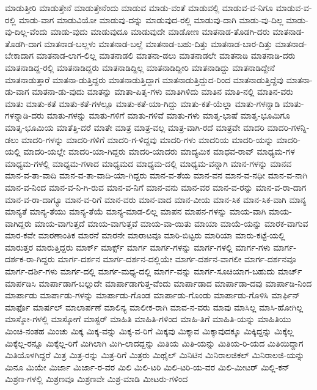 {ಮಾಡುತ್ತೀರಿ
ಮಾಡುತ್ತೇನೆ
ಮಾಡುತ್ತೇನೆಂದು
ಮಾಡುವ
ಮಾಡು-ವಂತೆ
ಮಾಡುವಲ್ಲಿ
ಮಾಡುವ-ವ-ನಿಗೂ
ಮಾಡುವ-ವ-ರಲ್ಲಿ
ಮಾಡು-ವಾಗ
ಮಾಡುವಿಯೋ
ಮಾಡುವು-ದನ್ನು
ಮಾಡುವುದ-ರಲ್ಲಿ
ಮಾಡುವು-ದಾಗಿ
ಮಾಡು-ವು-ದಿಲ್ಲ
ಮಾಡು-ವು-ದಿಲ್ಲ-ವೆಂದು
ಮಾಡು-ವುದು
ಮಾಡುವುದೂ
ಮಾಡುವುದೇ
ಮಾಡೋಣ
ಮಾತನಾಡ-ತೊಡಗಿ-ದರು
ಮಾತನಾಡ-ತೊಡಗಿ-ದಾಗ
ಮಾತನಾಡ-ಬಲ್ಲಳು
ಮಾತನಾಡ-ಬಲ್ಲೆ
ಮಾತನಾಡ-ಬಹು-ದಿತ್ತು
ಮಾತನಾಡ-ಬಾರ-ದಿತ್ತು
ಮಾತನಾಡ-ಬೇಕಾದಾಗ
ಮಾತನಾಡ-ಲಾಗ-ಲಿಲ್ಲ
ಮಾತನಾಡಲಿ
ಮಾತನಾ-ಡಲು
ಮಾತನಾಡಲೇ
ಮಾತನಾಡಿ
ಮಾತನಾಡಿ-ದರು
ಮಾತನಾಡಿದ್ದ-ರಲ್ಲಿ
ಮಾತನಾಡಿದ್ದರು
ಮಾತನಾಡಿದ್ದಿಲ್ಲ
ಮಾತನಾಡಿದ್ದೀರಿ
ಮಾತನಾಡಿದ್ದು
ಮಾತನಾಡಿದ್ದೇನೆ
ಮಾತನಾಡುತ್ತಾರೆ
ಮಾತನಾ-ಡುತ್ತಿದ್ದರು
ಮಾತನಾಡುತ್ತಿದ್ದಾಗ
ಮಾತನಾಡುತ್ತಿದ್ದುದ-ರಿಂದ
ಮಾತನಾಡುತ್ತಿದ್ದೆವು
ಮಾತನಾ-ಡು-ವಾಗ
ಮಾತನಾ-ಡು-ವುದು
ಮಾತನ್ನು
ಮಾತಾ-ಪಿತೃ-ಗಳು
ಮಾತಿಗಿಳಿದು
ಮಾತಿನ
ಮಾತಿ-ನಲ್ಲಿ
ಮಾತಿನ-ವರು
ಮಾತು
ಮಾತು-ಕತೆ
ಮಾತು-ಕತೆ-ಗಳಲ್ಲೂ
ಮಾತು-ಕತೆ-ಯಾ-ಗಿದ್ದು
ಮಾತು-ಕತೆ-ಯೆಲ್ಲಾ
ಮಾತು-ಗಳನ್ನಾಡಿ
ಮಾತು-ಗಳನ್ನಾಡಿ-ದರು
ಮಾತು-ಗಳನ್ನು
ಮಾತು-ಗಳಿಗೆ
ಮಾತು-ಗಳಿವೆ
ಮಾತು-ಗಳು
ಮಾತೃ-ಭಾಷೆ
ಮಾತೃ-ಭೂಮಿಗೂ
ಮಾತೃ-ಭೂಮಿಯ
ಮಾತೆತ್ತಿ-ದರೆ
ಮಾತೇ
ಮಾತ್ರ
ಮಾತ್ರ-ವಲ್ಲ
ಮಾತ್ರ-ವಾಗಿ-ರದೆ
ಮಾತ್ರವೇ
ಮಾದರಿ
ಮಾದರಿ-ಗಳನ್ನಿ-ಡಲು
ಮಾದರಿ-ಗಳನ್ನು
ಮಾದರಿ-ಗಳಿಗೆ
ಮಾದರಿ-ಗ-ಳಿದ್ದವು
ಮಾದರಿ-ಗಳು
ಮಾದರಿಯ
ಮಾದರಿ-ಯನ್ನು
ಮಾದರಿ-ಯಲ್ಲಿ
ಮಾದರಿ-ಯಲ್ಲೇ
ಮಾದರಿ-ಯಾ-ಗಿದ್ದರು
ಮಾದರಿ-ಯಾದರು
ಮಾದ್ಯಮಿಕ
ಮಾಧವ-ರಾವ್
ಮಾಧ್ಯಮ-ಗಳ
ಮಾಧ್ಯಮ-ಗಳಲ್ಲಿ
ಮಾಧ್ಯಮ-ಗಳಾದ
ಮಾಧ್ಯಮದ
ಮಾಧ್ಯಮ-ದಲ್ಲಿ
ಮಾಧ್ಯಮ-ವನ್ನಾಗಿ
ಮಾನ-ಗಳನ್ನು
ಮಾನವ
ಮಾನ-ವ-ತಾ-ವಾದಿ
ಮಾನ-ವ-ತಾ-ವಾದಿ-ಯಾ-ಗಿದ್ದರು
ಮಾನ-ವ-ತೆಯ
ಮಾನ-ವನ
ಮಾನ-ವ-ನಧೀ
ಮಾನ-ವ-ನಾಗಿ
ಮಾನ-ವ-ನಿಂದ
ಮಾನ-ವ-ನಿ-ಗಿ-ರುವ
ಮಾನ-ವ-ನಿಗೆ
ಮಾನ-ವನು
ಮಾನ-ವರ
ಮಾನ-ವ-ರನ್ನು
ಮಾನ-ವ-ರಾ-ದಾಗ
ಮಾನ-ವ-ರಾ-ದಾಗ್ಯೂ
ಮಾನ-ವ-ರಿಗೆ
ಮಾನ-ವರು
ಮಾನ-ವಾದ
ಮಾನ-ವೀಯ
ಮಾನ-ಸಿಕ
ಮಾನ-ಸಿಕ-ವಾಗಿ
ಮಾನ್ಯ
ಮಾನ್ಯತೆ
ಮಾನ್ಯ-ತೆಯು
ಮಾನ್ಯ-ತೆಯೆ
ಮಾನ್ಯ-ಮಾಡ-ಲಿಲ್ಲ
ಮಾಪನ
ಮಾಪನ-ಗಳನ್ನು
ಮಾಯ-ವಾಗಿ
ಮಾಯ-ವಾಗಿದ್ದರು
ಮಾಯ-ವಾಗುತ್ತದೆ
ಮಾಯ-ವಾಗುತ್ತವೆ
ಮಾಯ-ವಾ-ಯಿತು
ಮಾಯಾ
ಮಾಯೆ-ಯನ್ನು
ಮಾರಕ-ವಾಗುವ
ಮಾರ-ಕವೇ
ಮಾರಣಾಂತಿಕ
ಮಾರನೆ
ಮಾರನೇ
ಮಾರಾಟವೂ
ಮಾರಿ-ಬಿಟ್ಟರು
ಮಾರಿಯಾ
ಮಾರು-ಕಟ್ಟೆ-ಯಲ್ಲಿ
ಮಾರುತ್ತರ
ಮಾರುತ್ತಿದ್ದರು
ಮಾರ್ಕ್
ಮಾರ್ಕ್ಸ್
ಮಾರ್ಗ
ಮಾರ್ಗ-ಗಳನ್ನು
ಮಾರ್ಗ-ಗಳಲ್ಲಿ
ಮಾರ್ಗ-ಗಳು
ಮಾರ್ಗ-ದರ್ಶಕ-ರಾ-ಗಿದ್ದರು
ಮಾರ್ಗ-ದರ್ಶನ
ಮಾರ್ಗ-ದರ್ಶನ-ದಲ್ಲಿಯೇ
ಮಾರ್ಗ-ದರ್ಶನ-ವಾಗಲೀ
ಮಾರ್ಗ-ದರ್ಶನವೂ
ಮಾರ್ಗ-ದರ್ಶಿ-ಗಳು
ಮಾರ್ಗ-ದಲ್ಲಿ
ಮಾರ್ಗ-ಮಧ್ಯ-ದಲ್ಲಿ
ಮಾರ್ಗ-ವನ್ನು
ಮಾರ್ಗ-ಸೂಚಿಯಾಗ-ಬಹುದು
ಮಾರ್ಚ್
ಮಾರ್ಪಡಿಸಿ
ಮಾರ್ಪಾಡಾಗ-ಬಲ್ಲುದೇ
ಮಾರ್ಪಾಡಾಗುತ್ತ-ವೆಂದು
ಮಾರ್ಪಾಡಾದ
ಮಾರ್ಪಾಡಾ-ದವು
ಮಾರ್ಪಾಡಿ-ನಿಂದ
ಮಾರ್ಪಾಡು
ಮಾರ್ಪಾಡು-ಗಳನ್ನು
ಮಾರ್ಪಾಡು-ಗೊಂಡ
ಮಾರ್ಪಾಡು-ಗೊಂಡು
ಮಾರ್ಪಾಡು-ಗೊಳಿಸಿ
ಮಾರ್ಫಿನ್
ಮಾರ್ಫೊ
ಮಾರ್ಷಲ್
ಮಾಲಾರ್ಪಣೆ
ಮಾಲಿನ್ಯ
ಮಾಲೀಕ-ರಾಗಿ
ಮಾವ-ನ-ವರು
ಮಾವು
ಮಾಸಿಲ್ಲ
ಮಾಸಿ-ಹೋಗಿಲ್ಲ
ಮಾಸ್ಕೋ-ಗಳಲ್ಲಿ
ಮಾಸ್ಕೋಗೆ
ಮಾಸ್ಟರ್
ಮಾಹಿತಿ
ಮಾಹಿತಿ-ಗಳಿಂದ
ಮಾಹಿ-ತಿಗೆ
ಮಾಹಿತಿ-ಯನ್ನು
ಮಾಹಿತಿಯು
ಮಿಂಚಿ-ನಂತಹ
ಮಿಂಚು
ಮಿಕ್ಕ
ಮಿಕ್ಕ-ವನ್ನು
ಮಿಕ್ಕ-ವ-ರಿಗೆ
ಮಿಕ್ಕವು
ಮಿಕ್ಕಾವ
ಮಿಕ್ಕಾವುದಕ್ಕೂ
ಮಿಕ್ಕಿದ್ದನ್ನು
ಮಿಕ್ಕೆಲ್ಲ
ಮಿಕ್ಕೆಲ್ಲ-ರನ್ನೂ
ಮಿಕ್ಕೆಲ್ಲ-ರಿಗೆ
ಮಿಗಿಲಾಗಿ
ಮಿಗಿ-ಲಾದದ್ದನ್ನು
ಮಿತಿಯ
ಮಿತಿ-ಯನ್ನು
ಮಿತಿಯ-ರಿ-ಯದ
ಮಿತಿಯಿದ್ದಾಗ
ಮಿತಿಯೊಳಗಿದ್ದರೆ
ಮಿತ್ರ
ಮಿತ್ರ-ರನ್ನು
ಮಿತ್ರ-ರಿಗೆ
ಮಿತ್ರರು
ಮಿಥೈಲ್
ಮಿನಿಟಿನ
ಮಿನಿರಾಲಜಿಕಲ್
ಮಿನಿರಾಲಜಿ-ಯನ್ನು
ಮಿನೂ
ಮಿಯೇ
ಮಿರ್ಜಾ
ಮಿರ್ಜಾ-ರ-ವರ
ಮಿಲಿ
ಮಿಲಿ-ಟರಿ
ಮಿಲಿ-ಟರಿ-ಯ-ವರ
ಮಿಲಿ-ಮೀಟರ್
ಮಿಲ್ಲಿ-ಕನ್
ಮಿಶ್ರಣ-ಗಳಲ್ಲಿ
ಮಿಶ್ರಣವೂ
ಮಿಶ್ರಣವೇ
ಮಿಶ್ರ-ಮಾಡಿ
ಮೀಟರು-ಗಳಿಂದ
}
